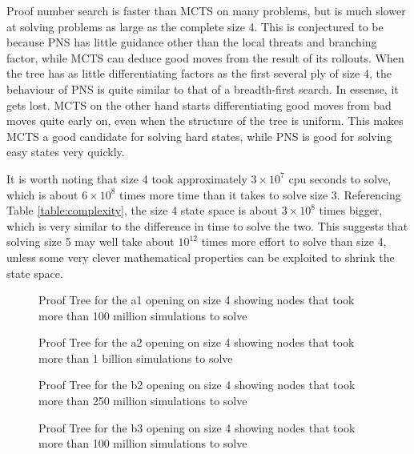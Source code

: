 Proof number search is faster than MCTS on many problems, but is much slower at solving problems as large as the complete size 4. This is conjectured to be because PNS has little guidance other than the local threats and branching factor, while MCTS can deduce good moves from the result of its rollouts. When the tree has as little differentiating factors as the first several ply of size 4, the behaviour of PNS is quite similar to that of a breadth-first search. In essense, it gets lost. MCTS on the other hand starts differentiating good moves from bad moves quite early on, even when the structure of the tree is uniform. This makes MCTS a good candidate for solving hard states, while PNS is good for solving easy states very quickly.

It is worth noting that size 4 took approximately $3 \times 10^7$ cpu seconds to solve, which is about $6 \times 10^8$ times more time than it takes to solve size 3. Referencing Table \ref{table:complexity}, the size 4 state space is about $3 \times 10^8$ times bigger, which is very similar to the difference in time to solve the two. This suggests that solving size 5 may well take about $10^{12}$ times more effort to solve than size 4, unless some very clever mathematical properties can be exploited to shrink the state space. %

\begin{figure}
\centering

\caption{Proof Tree for the a1 opening on size 4 showing nodes that took more than 100 million simulations to solve}
\label{fig:proof-a1}
\end{figure}

\begin{figure}
\centering

\caption{Proof Tree for the a2 opening on size 4 showing nodes that took more than 1 billion simulations to solve}
\label{fig:proof-a2}
\end{figure}

\begin{figure}
\centering

\caption{Proof Tree for the b2 opening on size 4 showing nodes that took more than 250 million simulations to solve}
\label{fig:proof-b2}
\end{figure}

\begin{figure}
\centering

\caption{Proof Tree for the b3 opening on size 4 showing nodes that took more than 100 million simulations to solve}
\label{fig:proof-b3}
\end{figure}


